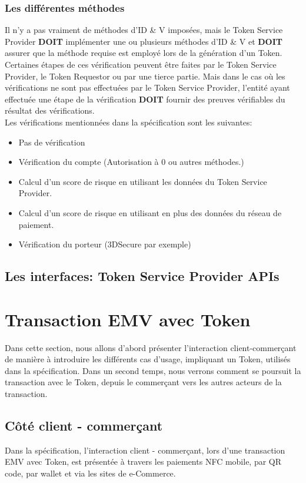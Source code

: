 \documentclass{report}
\begin{document}
\subsubsection{Les différentes méthodes}
Il n'y a pas vraiment de méthodes d'ID \& V imposées, mais le Token Service Provider \textbf{DOIT} implémenter une ou plusieurs méthodes d'ID \& V et \textbf{DOIT} assurer que la méthode requise est employé lors de la génération d'un Token. Certaines étapes de ces vérification peuvent être faites par le Token Service Provider, le Token Requestor ou par une tierce partie. Mais dans le cas où les vérifications ne sont pas effectuées par le Token Service Provider, l'entité ayant effectuée une étape de la vérification \textbf{DOIT} fournir des preuves vérifiables du résultat des vérifications.\\
Les vérifications mentionnées dans la spécification sont les suivantes:
\begin{itemize}
	\item Pas de vérification
	\item Vérification du compte (Autorisation à 0 ou autres méthodes.)
	\item Calcul d'un score de risque en utilisant les données du Token Service Provider.
	\item Calcul d'un score de risque en utilisant en plus des données du réseau de paiement.
	\item Vérification du porteur (3DSecure par exemple)
\end{itemize}

\subsection{Les interfaces: Token Service Provider APIs}



\section{Transaction EMV avec Token}
Dans cette section, nous allons d'abord présenter l'interaction client-commerçant de manière à introduire les différents cas d'usage, impliquant un Token, utilisés dans la spécification. Dans un second temps, nous verrons comment se poursuit la transaction avec le Token, depuis le commerçant vers les autres acteurs de la transaction.

\subsection{Côté client - commerçant}
Dans la spécification, l'interaction client - commerçant, lors d'une transaction EMV avec Token, est présentée à travers les paiements NFC mobile, par QR code, par wallet et via les sites de e-Commerce.\\
\end{document}
